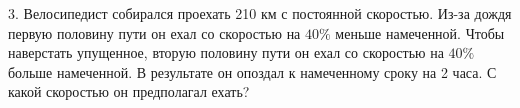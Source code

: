 3. Велосипедист собирался проехать 210 км с постоянной скоростью. Из-за дождя первую половину пути он ехал со скоростью на $40\%$ меньше намеченной. Чтобы наверстать упущенное, вторую половину пути он ехал со скоростью на $40\%$ больше намеченной. В результате он опоздал к намеченному сроку на 2 часа. С какой скоростью он предполагал ехать?\\

